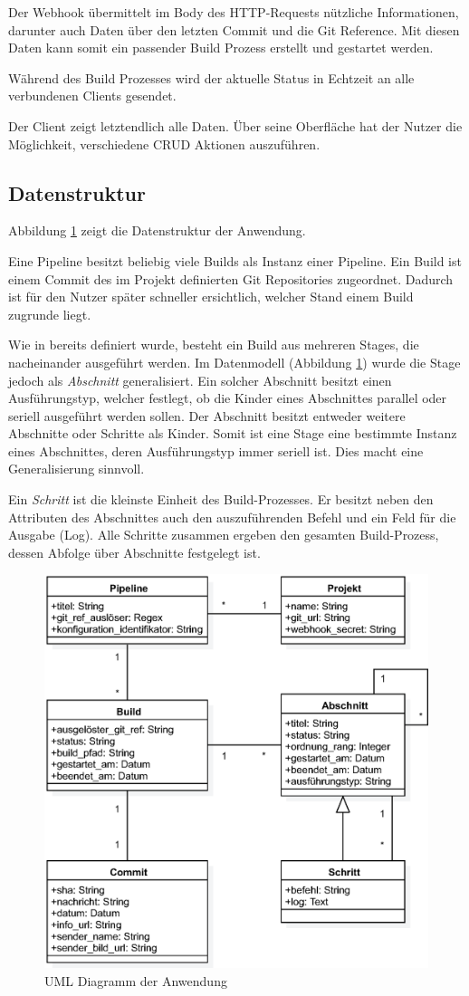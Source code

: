 Der Webhook übermittelt im Body des HTTP-Requests nützliche Informationen, darunter auch Daten über den letzten Commit und die Git Reference. Mit diesen Daten kann somit ein passender Build Prozess erstellt und gestartet werden.

Während des Build Prozesses wird der aktuelle Status in Echtzeit an alle verbundenen Clients gesendet.

Der Client zeigt letztendlich alle Daten. Über seine Oberfläche hat der Nutzer die Möglichkeit, verschiedene \ac{CRUD} Aktionen auszuführen.

\subsection{Datenstruktur}
\label{subsec:uml}

Abbildung \ref{fig:uml} zeigt die Datenstruktur der Anwendung.

Eine Pipeline besitzt beliebig viele Builds als Instanz einer Pipeline. Ein Build ist einem Commit des im Projekt definierten Git Repositories zugeordnet. Dadurch ist für den Nutzer später schneller ersichtlich, welcher Stand einem Build zugrunde liegt.

Wie in  bereits definiert wurde, besteht ein Build aus mehreren Stages, die nacheinander ausgeführt werden. Im Datenmodell (Abbildung \ref{fig:uml}) wurde die Stage jedoch als \emph{Abschnitt} generalisiert. Ein solcher Abschnitt besitzt einen Ausführungstyp, welcher festlegt, ob die Kinder eines Abschnittes parallel oder seriell ausgeführt werden sollen. Der Abschnitt besitzt entweder weitere Abschnitte oder Schritte als Kinder. Somit ist eine Stage eine bestimmte Instanz eines Abschnittes, deren Ausführungstyp immer seriell ist. Dies macht eine Generalisierung sinnvoll.

Ein \emph{Schritt} ist die kleinste Einheit des Build-Prozesses. Er besitzt neben den Attributen des Abschnittes auch den auszuführenden Befehl und ein Feld für die Ausgabe (Log). Alle Schritte zusammen ergeben den gesamten Build-Prozess, dessen Abfolge über Abschnitte festgelegt ist.

\begin{figure}[h]
  \caption{UML Diagramm der Anwendung}
  \label{fig:uml}
  \centering
    \includegraphics[width=\textwidth]{assets/uml}
\end{figure}
